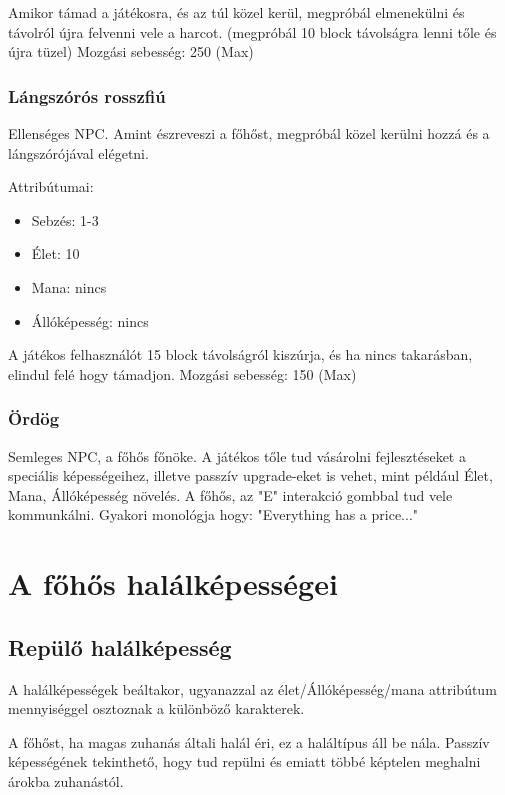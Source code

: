 \documentclass[a4paper]{article}
\begin{document}
Amikor támad a játékosra, és az túl közel kerül, megpróbál elmenekülni és távolról újra felvenni vele a harcot.
(megpróbál 10 block távolságra lenni tőle és újra tüzel)
Mozgási sebesség: 250 (Max)

\subsubsection{Lángszórós rosszfiú}

Ellenséges NPC. Amint észreveszi a főhőst, megpróbál közel kerülni hozzá és a lángszórójával elégetni.

Attribútumai:
\begin{itemize}
\item Sebzés: 1-3
\item Élet: 10
\item Mana: nincs
\item Állóképesség: nincs
\end{itemize}

A játékos felhasználót 15 block távolságról kiszúrja, és ha nincs takarásban, elindul felé hogy támadjon.
Mozgási sebesség: 150 (Max)

\subsubsection{Ördög}


Semleges NPC, a főhős főnöke.
A játékos tőle tud vásárolni fejlesztéseket a speciális képességeihez, illetve passzív upgrade-eket is vehet, mint például Élet, Mana, Állóképesség növelés.
A főhős, az "E" interakció gombbal tud vele kommunkálni.
Gyakori monológja hogy: "Everything has a price..."

\section{A főhős halálképességei}

\subsection{Repülő halálképesség}

A halálképességek beáltakor, ugyanazzal az élet/Állóképesség/mana attribútum mennyiséggel osztoznak a különböző karakterek.

A főhőst, ha magas zuhanás általi halál éri, ez a haláltípus áll be nála.
Passzív képességének tekinthető, hogy tud repülni és emiatt többé képtelen meghalni árokba zuhanástól.
\end{document}
